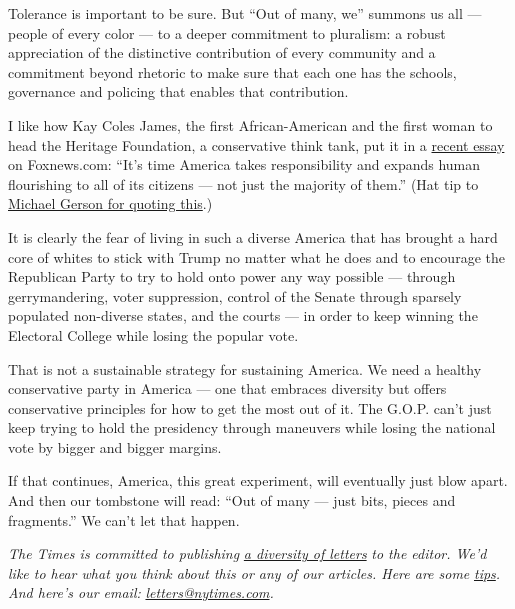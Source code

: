 Tolerance is important to be sure. But ``Out of many, we'' summons us
all --- people of every color --- to a deeper commitment to pluralism: a
robust appreciation of the distinctive contribution of every community
and a commitment beyond rhetoric to make sure that each one has the
schools, governance and policing that enables that contribution.

I like how Kay Coles James, the first African-American and the first
woman to head the Heritage Foundation, a conservative think tank, put it
in a
\href{https://www.foxnews.com/opinion/george-floyds-senseless-killing-end-racism-americas-cancer-kay-coles-james}{recent
essay} on Foxnews.com: ``It's time America takes responsibility and
expands human flourishing to all of its citizens --- not just the
majority of them.'' (Hat tip to
\href{https://www.washingtonpost.com/opinions/this-is-what-happens-when-bigotry-dominates-the-main-conservative-media-platform/2020/06/08/c1deaf50-a9ba-11ea-a9d9-a81c1a491c52_story.html}{Michael
Gerson for quoting this}.)

It is clearly the fear of living in such a diverse America that has
brought a hard core of whites to stick with Trump no matter what he does
and to encourage the Republican Party to try to hold onto power any way
possible --- through gerrymandering, voter suppression, control of the
Senate through sparsely populated non-diverse states, and the courts ---
in order to keep winning the Electoral College while losing the popular
vote.

That is not a sustainable strategy for sustaining America. We need a
healthy conservative party in America --- one that embraces diversity
but offers conservative principles for how to get the most out of it.
The G.O.P. can't just keep trying to hold the presidency through
maneuvers while losing the national vote by bigger and bigger margins.

If that continues, America, this great experiment, will eventually just
blow apart. And then our tombstone will read: ``Out of many --- just
bits, pieces and fragments.'' We can't let that happen.

\emph{The Times is committed to publishing}
\href{https://www.nytimes.com/2019/01/31/opinion/letters/letters-to-editor-new-york-times-women.html}{\emph{a
diversity of letters}} \emph{to the editor. We'd like to hear what you
think about this or any of our articles. Here are some}
\href{https://help.nytimes.com/hc/en-us/articles/115014925288-How-to-submit-a-letter-to-the-editor}{\emph{tips}}\emph{.
And here's our email:}
\href{mailto:letters@nytimes.com}{\emph{letters@nytimes.com}}\emph{.}

